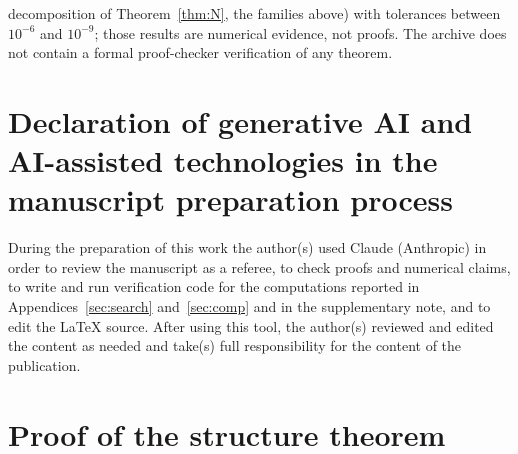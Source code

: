 \documentclass[preprint,11pt]{elsarticle}
\theoremstyle{definition}
\theoremstyle{remark}
\begin{document}
decomposition of Theorem~\ref{thm:N}, the families above) with tolerances between $10^{-6}$ and $10^{-9}$; those results are numerical evidence, not proofs. The archive does not contain a formal proof-checker verification of any theorem.

\section*{Declaration of generative AI and AI-assisted technologies in the manuscript preparation process}
During the preparation of this work the author(s) used Claude (Anthropic) in order to review the manuscript as a referee, to check proofs and numerical claims, to write and run verification code for the computations reported in Appendices~\ref{sec:search} and~\ref{sec:comp} and in the supplementary note, and to edit the \LaTeX{} source. After using this tool, the author(s) reviewed and edited the content as needed and take(s) full responsibility for the content of the publication.


\appendix

\section{Proof of the structure theorem}\label{app:G}
\end{document}
